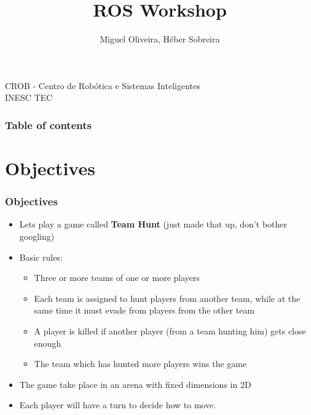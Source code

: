 \documentclass[]{beamer}
\begin{document}
\title{ROS Workshop}  
\author{Miguel Oliveira, H\'{e}ber Sobreira}

\begin{frame}
\titlepage
\scriptsize CROB - Centro de Rob\'{o}tica e Sistemas Inteligentes \\
\scriptsize INESC TEC\\
\end{frame}

\begin{frame}\frametitle{Table of contents}
\scriptsize
\tableofcontents
\end{frame} 


\section{Objectives} 
\begin{frame}\frametitle{Objectives} 
\begin{itemize}
\item Lets play a game called \textbf{Team Hunt} (just made that up, don't
        bother googling)
\item Basic rules: 
\begin{itemize}
\item Three or more teams of one or more players
\item Each team is assigned to hunt players from another team, while at the same
time it must evade from players from the other team
\item A player is killed if another player (from a team hunting him) gets close
enough
\item The team which has hunted more players wins the game
\end{itemize}
\item The game take place in an arena with fixed dimensions in 2D
\item Each player will have a turn to decide how to move.
\end{itemize}
\end{frame}
\end{document}
